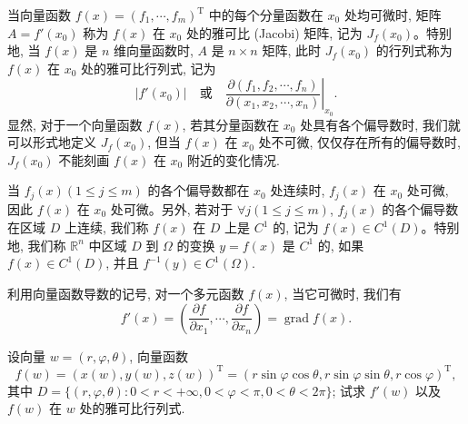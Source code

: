 当向量函数 $f(x)=(f_1,\cdots,f_m)^\mathrm T$ 中的每个分量函数在 $x_0$ 处均可微时, 矩阵 $A=f'(x_0)$ 称为 $f(x)$ 在 $x_0$ 处的雅可比 (Jacobi) 矩阵, 记为 $J_f(x_0)$。特别地, 当 $f(x)$ 是 $n$ 维向量函数时, $A$ 是 $n\times n$ 矩阵, 此时 $J_f(x_0)$ 的行列式称为 $f(x)$ 在 $x_0$ 处的雅可比行列式, 记为
\[
  |f'(x_0)|\quad\text{或}\quad
  \left.\frac{\partial(f_1,f_2,\cdots,f_n)}{\partial(x_1,x_2,\cdots,x_n)}\right|_{x_0}.
\]
显然, 对于一个向量函数 $f(x)$, 若其分量函数在 $x_0$ 处具有各个偏导数时, 我们就可以形式地定义 $J_f(x_0)$, 但当 $f(x)$ 在 $x_0$ 处不可微, 仅仅存在所有的偏导数时, $J_f(x_0)$ 不能刻画 $f(x)$ 在 $x_0$ 附近的变化情况.

当 $f_j(x)(1\leqslant j\leqslant m)$ 的各个偏导数都在 $x_0$ 处连续时, $f_j(x)$ 在 $x_0$ 处可微, 因此 $f(x)$ 在 $x_0$ 处可微。另外, 若对于 $\forall j(1\leqslant j\leqslant m)$, $f_j(x)$ 的各个偏导数在区域 $D$ 上连续, 我们称 $f(x)$ 在 $D$ 上是 $C^1$ 的, 记为 $f(x)\in C^1(D)$。特别地, 我们称 $\mathbb R^n$ 中区域 $D$ 到 $\Omega$ 的变换 $y=f(x)$ 是 $C^1$ 的, 如果 $f(x)\in C^1(D)$, 并且 $f^{-1}(y)\in C^1(\Omega)$.

\begin{remark}\label{remark:ma-14-source-30}
利用向量函数导数的记号, 对一个多元函数 $f(x)$, 当它可微时, 我们有
\[
  f'(x)=\left(\frac{\partial f}{\partial x_1},\cdots,\frac{\partial f}{\partial x_n}\right)=\operatorname{grad}f(x).
\]
\end{remark}


\begin{example}\label{example:ma-14-1-8}
设向量 $w=(r,\varphi,\theta)$, 向量函数
\[
  f(w)=(x(w),y(w),z(w))^\mathrm T
  =(r\sin\varphi\cos\theta,r\sin\varphi\sin\theta,r\cos\varphi)^\mathrm T,
\]
其中 $D=\{(r,\varphi,\theta):0<r<+\infty,0<\varphi<\pi,0<\theta<2\pi\}$; 试求 $f'(w)$ 以及 $f(w)$ 在 $w$ 处的雅可比行列式.
\end{example}


